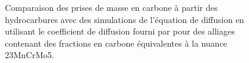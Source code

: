 \begin{figure}[h]
  \centering{}
  
  \caption{\label{fig:mass_intake_hydrocarbon}Comparaison des prises de masse en carbone à partir des hydrocarbures avec des simulations de l'équation de diffusion en utilisant le coefficient de diffusion fourni par \citet{Slycke1981ii} pour des alliages  contenant des fractions en carbone équivalentes à la nuance 23MnCrMo5.}
\end{figure}

